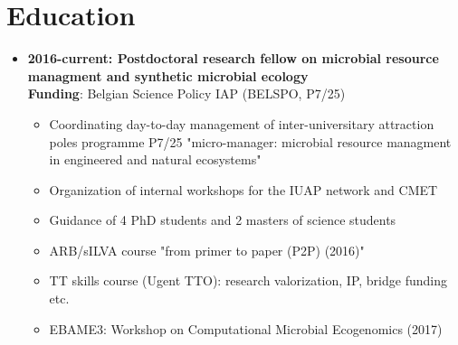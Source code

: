 \documentclass[a4paper,11pt,oneside]{article}
\begin{document}
\section*{Education}
\begin{itemize}
\item \textbf{2016-current: Postdoctoral research fellow on microbial resource managment and synthetic microbial ecology}\\
\textbf{Funding}: Belgian Science Policy IAP (BELSPO, P7/25)
    \begin{itemize}
      \item Coordinating day-to-day management of inter-universitary attraction poles programme P7/25 "micro-manager: microbial resource managment in engineered and natural ecosystems"
      \item Organization of internal workshops for the IUAP network and CMET
      \item Guidance of 4 PhD students and 2 masters of science students
      \item ARB/sILVA course "from primer to paper (P2P) (2016)"
      \item TT skills course (Ugent TTO): research valorization, IP, bridge funding etc.
      \item EBAME3: Workshop on Computational Microbial Ecogenomics (2017)
    \end{itemize}


\end{itemize}
\end{document}
